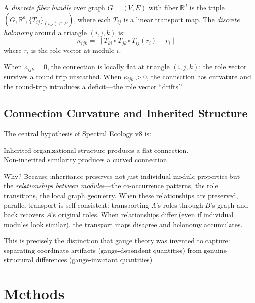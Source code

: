 \documentclass{../yalumba}
\begin{document}
\begin{definition}
A \emph{discrete fiber bundle} over graph $G = (V, E)$ with fiber
$\mathbb{R}^d$ is the triple $(G, \mathbb{R}^d, \{T_{ij}\}_{(i,j) \in
E})$, where each $T_{ij}$ is a linear transport map.  The \emph{discrete
holonomy} around a triangle $(i, j, k)$ is:
\begin{equation}
  \kappa_{ijk} = \|T_{ki} \circ T_{jk} \circ T_{ij}(r_i) - r_i\|
  \label{eq:discrete-holonomy}
\end{equation}
where $r_i$ is the role vector at module $i$.
\end{definition}

When $\kappa_{ijk} = 0$, the connection is locally flat at triangle
$(i, j, k)$: the role vector survives a round trip unscathed.  When
$\kappa_{ijk} > 0$, the connection has curvature and the round-trip
introduces a deficit---the role vector ``drifts.''

\subsection{Connection Curvature and Inherited Structure}

The central hypothesis of Spectral Ecology v8 is:

\begin{pullquote}
Inherited organizational structure produces a flat connection.\\
Non-inherited similarity produces a curved connection.
\end{pullquote}

Why?  Because inheritance preserves not just individual module properties
but the \emph{relationships between modules}---the co-occurrence patterns,
the role transitions, the local graph geometry.  When these relationships
are preserved, parallel transport is self-consistent: transporting $A$'s
roles through $B$'s graph and back recovers $A$'s original roles.  When
relationships differ (even if individual modules look similar), the transport
maps disagree and holonomy accumulates.

This is precisely the distinction that gauge theory was invented to capture:
separating coordinate artifacts (gauge-dependent quantities) from genuine
structural differences (gauge-invariant quantities).


\section{Methods}
\label{sec:methods}
\end{document}
